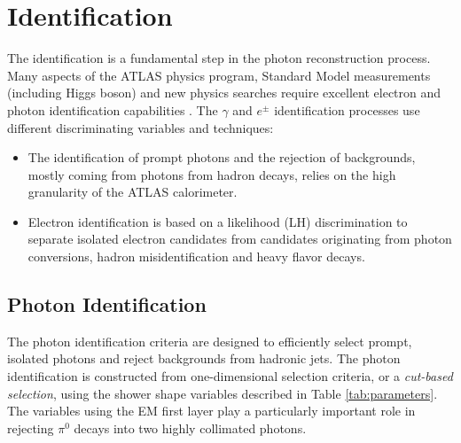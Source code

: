 \documentclass[a4paper, oneside, 11pt, openright]{book}
\begin{document}
		\section{Identification}\label{section:Ident}
			The identification is a fundamental step in the photon reconstruction process. Many aspects of the ATLAS physics program, Standard Model measurements (including Higgs boson) and new physics searches require excellent electron and photon identification capabilities \cite{el_id}\cite{ph_id}. The $\gamma$ and $e^\pm$ identification processes use different discriminating variables and techniques:
			\begin{itemize}
				\item The identification of prompt photons and the rejection of backgrounds, mostly coming from photons from hadron decays, relies on the high granularity of the ATLAS calorimeter.
				\item  Electron identification is based on a likelihood (LH) discrimination to separate isolated electron candidates from candidates originating from photon conversions, hadron misidentification and heavy flavor decays.
			\end{itemize}
			
			\subsection{Photon Identification}
				The photon identification criteria \cite{Aad_2019} are designed to efficiently select prompt, isolated photons and reject backgrounds from hadronic jets. The photon identification is constructed from one-dimensional selection criteria, or a \textit{cut-based selection}, using the shower shape variables described in Table \ref{tab:parameters}. The variables using the EM first layer play a particularly important role in rejecting $\pi^0$ decays into two highly collimated photons. 
				
\end{document}
